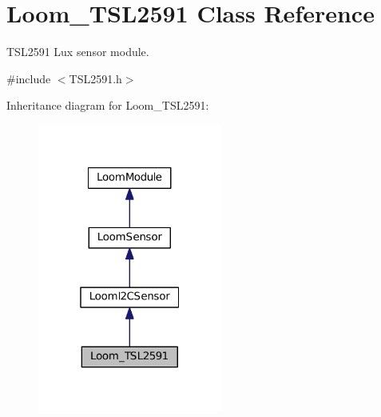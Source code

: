 \hypertarget{class_loom___t_s_l2591}{}\section{Loom\+\_\+\+T\+S\+L2591 Class Reference}
\label{class_loom___t_s_l2591}


T\+S\+L2591 Lux sensor module.  




{\ttfamily \#include $<$T\+S\+L2591.\+h$>$}



Inheritance diagram for Loom\+\_\+\+T\+S\+L2591\+:\nopagebreak
\begin{figure}[H]
\begin{center}
\leavevmode
\includegraphics[width=172pt]{class_loom___t_s_l2591__inherit__graph}
\end{center}
\end{figure}

